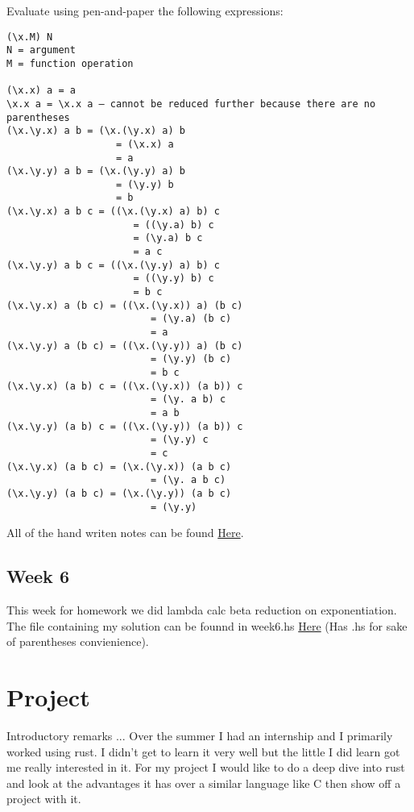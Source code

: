 \documentclass{article}
\theoremstyle{theorem}
\theoremstyle{definition}
\theoremstyle{remark}
\begin{document}
Evaluate using pen-and-paper the following expressions:
\begin{lstlisting}
(\x.M) N
N = argument
M = function operation

(\x.x) a = a
\x.x a = \x.x a — cannot be reduced further because there are no parentheses
(\x.\y.x) a b = (\x.(\y.x) a) b
                   = (\x.x) a
                   = a
(\x.\y.y) a b = (\x.(\y.y) a) b
                   = (\y.y) b
                   = b
(\x.\y.x) a b c = ((\x.(\y.x) a) b) c
                      = ((\y.a) b) c
                      = (\y.a) b c
                      = a c
(\x.\y.y) a b c = ((\x.(\y.y) a) b) c
                      = ((\y.y) b) c
                      = b c
(\x.\y.x) a (b c) = ((\x.(\y.x)) a) (b c)
                         = (\y.a) (b c)
                         = a
(\x.\y.y) a (b c) = ((\x.(\y.y)) a) (b c)
                         = (\y.y) (b c)
                         = b c
(\x.\y.x) (a b) c = ((\x.(\y.x)) (a b)) c
                         = (\y. a b) c
                         = a b
(\x.\y.y) (a b) c = ((\x.(\y.y)) (a b)) c
                         = (\y.y) c
                         = c
(\x.\y.x) (a b c) = (\x.(\y.x)) (a b c)
                         = (\y. a b c)
(\x.\y.y) (a b c) = (\x.(\y.y)) (a b c)
                         = (\y.y)
\end{lstlisting}

All of the hand writen notes can be found 
\href{https://github.com/alexhkurz/programming-languages-2022/blob/main/README.md}{Here}.

\subsection{Week 6}

This week for homework we did lambda calc beta reduction on exponentiation. The file containing my solution can be founnd in week6.hs \href{https://github.com/jacgoldberg/Programming-Lang/blob/main/week6.hs}{Here} (Has .hs for sake of parentheses convienience).

\section{Project}

Introductory remarks ...
Over the summer I had an internship and I primarily worked using rust. I didn't get to learn it very well but the little I did learn got me really interested in it. For my project I would like to do a deep dive into rust and look at the advantages it has over a similar language like C then show off a project with it.
\end{document}
